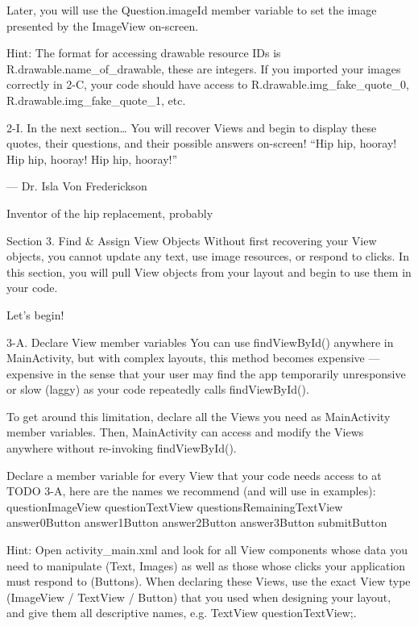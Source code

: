                 Later, you will use the Question.imageId member variable to set the image presented by the ImageView on-screen.

                        Hint: The format for accessing drawable resource IDs is R.drawable.name_of_drawable, these are integers.
                        If you imported your images correctly in 2-C, your code should have access to R.drawable.img_fake_quote_0, R.drawable.img_fake_quote_1, etc.

        2-I. In the next section…
                You will recover Views and begin to display these quotes, their questions, and their possible answers on-screen!
                        “Hip hip, hooray!
                        Hip hip, hooray!
                        Hip hip, hooray!”

                        — Dr. Isla Von Frederickson

                Inventor of the hip replacement, probably

Section 3. Find & Assign View Objects
                Without first recovering your View objects, you cannot update any text, use image resources, or respond to clicks. In this section, you will pull View objects from your layout and begin to use them in your code.

                Let’s begin!

        3-A. Declare View member variables
                You can use findViewById() anywhere in MainActivity, but with complex layouts, this method becomes expensive — expensive in the sense that your user may find the app temporarily unresponsive or slow (laggy) as your code repeatedly calls findViewById().

                To get around this limitation, declare all the Views you need as MainActivity member variables. Then, MainActivity can access and modify the Views anywhere without re-invoking findViewById().

                Declare a member variable for every View that your code needs access to at TODO 3-A, here are the names we recommend (and will use in examples):
                        questionImageView
                        questionTextView
                        questionsRemainingTextView
                        answer0Button
                        answer1Button
                        answer2Button
                        answer3Button
                        submitButton
                
                                Hint: Open activity_main.xml and look for all View components whose data you need to manipulate (Text, Images) as well as those whose clicks your application must respond to (Buttons).
                                When declaring these Views, use the exact View type (ImageView / TextView / Button) that you used when designing your layout, and give them all descriptive names, e.g. TextView questionTextView;.

